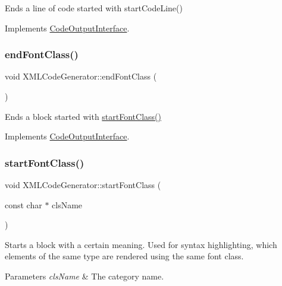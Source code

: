 Ends a line of code started with start\+Code\+Line() 

Implements \mbox{\hyperlink{class_code_output_interface_afac5763eafc78f93b82691fb9a6dcff7}{Code\+Output\+Interface}}.

\mbox{\label{class_x_m_l_code_generator_adbf57d4544dc1c27571b472f3990a385}} 
\subsubsection{\texorpdfstring{endFontClass()}{endFontClass()}}
{\footnotesize\ttfamily void X\+M\+L\+Code\+Generator\+::end\+Font\+Class (\begin{DoxyParamCaption}{ }\end{DoxyParamCaption})\hspace{0.3cm}{\ttfamily [virtual]}}

Ends a block started with \mbox{\hyperlink{class_x_m_l_code_generator_aa6d0288952109fba1efe98d82e863b70}{start\+Font\+Class()}} 

Implements \mbox{\hyperlink{class_code_output_interface_a2b8ac05a391dae36793aa3aa8714a0f6}{Code\+Output\+Interface}}.

\mbox{\label{class_x_m_l_code_generator_aa6d0288952109fba1efe98d82e863b70}} 
\subsubsection{\texorpdfstring{startFontClass()}{startFontClass()}}
{\footnotesize\ttfamily void X\+M\+L\+Code\+Generator\+::start\+Font\+Class (\begin{DoxyParamCaption}\item[{const char $\ast$}]{cls\+Name }\end{DoxyParamCaption})\hspace{0.3cm}{\ttfamily [virtual]}}

Starts a block with a certain meaning. Used for syntax highlighting, which elements of the same type are rendered using the same \textquotesingle{}font class\textquotesingle{}. 
\begin{DoxyParams}{Parameters}
{\em cls\+Name} & The category name. \\
\hline
\end{DoxyParams}


